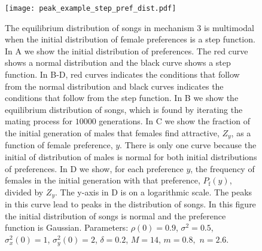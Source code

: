 \documentclass[12pt]{article}
\newcommand{\x}[1]{\text{#1}}
\begin{document}
\begin{figure}
\texttt{[image: peak\_example\_step\_pref\_dist.pdf]}
\caption{\label{peak_example_pref}  The equilibrium distribution of songs in mechanism 3 is multimodal when the initial distribution of female preferences is a step function. In A we show the initial distribution of preferences. The red curve shows a normal distribution and the black curve shows a step function. In B-D, red curves indicates the conditions that follow from the normal distribution and black curves indicates the conditions that follow from the step function. In B we show the equilibrium distribution of songs, which is found by iterating the mating process for $10000$ generations. In C we show the fraction of the initial generation of males that females find attractive, $Z_y$, as a function of female preference, $y$. There is only one curve because the initial of distribution of males is normal for both initial distributions of preferences. In D we show, for each preference $y$, the frequency of females in the initial generation with that preference, $P_\x{f}(y)$, divided by $Z_y$. The y-axis in D is on a logarithmic scale. The peaks in this curve lead to peaks in the distribution of songs. In this figure the initial distribution of songs is normal and the preference function is Gaussian. Parameters: $\rho(0)=0.9$, $\sigma^2=0.5$, $\sigma_x^2(0)=1$, $\sigma_y^2(0)=2$, $\delta=0.2$, $M=14$, $m=0.8,$ $n=2.6$. 
}
\end{figure}
\end{document}
